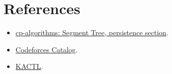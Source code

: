 \section*{References}

\begin{itemize}
  \item \href{https://cp-algorithms.com/data_structures/segment_tree.html}{cp-algorithms: Segment Tree, persistence section}.
  \item \href{https://codeforces.com/catalog?locale=en}{Codeforces Catalog}.
  \item \href{https://github.com/kth-competitive-programming/kactl}{KACTL}.
\end{itemize}
